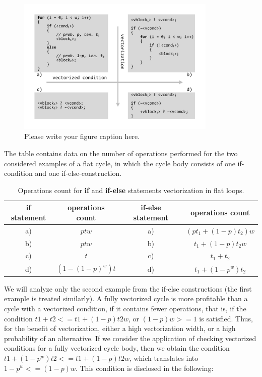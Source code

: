 \documentclass[
11pt,%
tightenlines,%
twoside,%
onecolumn,%
nofloats,%
nobibnotes,%
nofootinbib,%
superscriptaddress,%
noshowpacs,%
centertags]%
{revtex4}
\begin{document}
\begin{figure}[h]
\setcaptionmargin{5mm}
\onelinecaptionstrue  %
\includegraphics[width=0.85\textwidth]{pics/if_else_vectorization.pdf}
\caption{Please write your figure caption here.}\label{fig:1}
\end{figure}

The table contains data on the number of operations performed for the two considered examples of a flat cycle, in which the cycle body consists of one if-condition and one if-else-construction.

\begin{table}[!h]
\setcaptionmargin{0mm}
\onelinecaptionsfalse
{}
\caption{Operations count for \textbf{if} and \textbf{if-else} statements vectorization in flat loops.}
\bigskip
\begin{tabular}{|c|c|c|c|}
\hline
\textbf{if} statement & operations count & \textbf{if-else} statement & operations count \\
\hline
a) & $ptw$ & a) & $\left( pt_1 + (1 - p)t_2 \right)w$ \\
b) & $ptw$ & b) & $t_1 + (1 - p)t_2w$ \\
c) & $t$ & c) & $t_1 + t_2$ \\
d) & $\left( 1 - (1 - p)^w \right)t$ & d) & $t_1 + (1 - p^w)t_2$ \\
\hline
\end{tabular}
\end{table}

We will analyze only the second example from the if-else constructions (the first example is treated similarly). A fully vectorized cycle is more profitable than a cycle with a vectorized condition, if it contains fewer operations, that is, if the condition $t1 + t2 <= t1 + (1 - p) t2w$, or $(1 - p) w >= 1$ is satisfied. Thus, for the benefit of vectorization, either a high vectorization width, or a high probability of an alternative. If we consider the application of checking vectorized conditions for a fully vectorized cycle body, then we obtain the condition $t1 + (1 - p ^ w) t2 <= t1 + (1 - p) t2w$, which translates into $1 - p ^ w <= (1 - p) w$. This condition is disclosed in the following:
\end{document}

